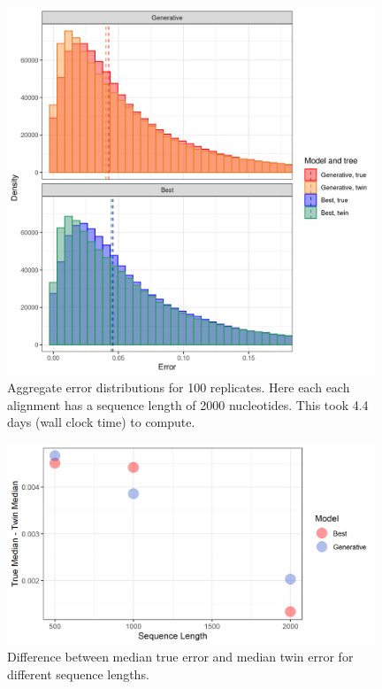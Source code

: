 \begin{figure}[H]
  \includegraphics[width=0.98\textwidth]{pirouette_example_34/errors.png}
  \caption{Aggregate error distributions for 100 replicates. 
    Here each each alignment has a sequence length of 2000 nucleotides. 
    This took 4.4 days (wall clock time) to compute.}
  \label{fig:example_2000_nucleotides}
\end{figure}

\begin{figure}[H]
  \includegraphics[width=0.98\textwidth]{supplementary_figures/plot_error_vs_sequence_length.png}
  \caption{Difference between median true error and median twin error for different sequence lengths.}
  \label{fig:error_vs_seqlength}
\end{figure}

